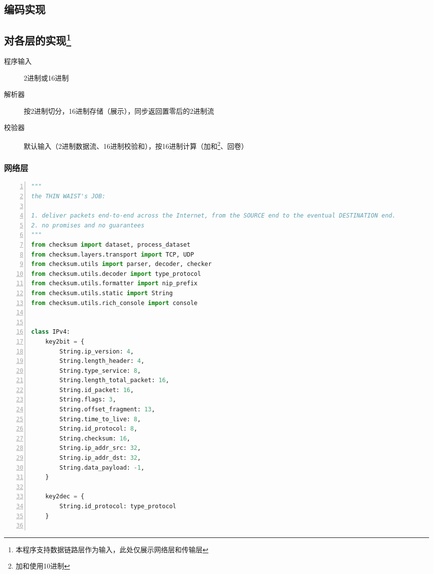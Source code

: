 \documentclass[a4paper,11pt]{article}
\begin{document}
\begin{spacing}{1.2}
\begin{CJK}{UTF8}{gbsn}
\section{编码实现}

\subsection{对各层的实现\footnote{本程序支持数据链路层作为输入，此处仅展示网络层和传输层}}

\begin{description}
	\item [程序输入] 2进制或16进制
	\item [解析器] 按2进制切分，16进制存储（展示），同步返回置零后的2进制流
	\item [校验器] 默认输入（2进制数据流、16进制校验和），按16进制计算（加和\footnote{加和使用10进制}、回卷）
\end{description}

\subsubsection{网络层}

\begin{lstlisting}[language = Python, numbers=left, numberstyle=\tiny,keywordstyle=\color{blue!70},commentstyle=\color{red!50!green!50!blue!50},frame=shadowbox,rulesepcolor=\color{red!20!green!20!blue!20},basicstyle=\ttfamily]
"""
the THIN WAIST's JOB:

1. deliver packets end-to-end across the Internet, from the SOURCE end to the eventual DESTINATION end.
2. no promises and no guarantees
"""
from checksum import dataset, process_dataset
from checksum.layers.transport import TCP, UDP
from checksum.utils import parser, decoder, checker
from checksum.utils.decoder import type_protocol
from checksum.utils.formatter import nip_prefix
from checksum.utils.static import String
from checksum.utils.rich_console import console


class IPv4:
    key2bit = {
        String.ip_version: 4,
        String.length_header: 4,
        String.type_service: 8,
        String.length_total_packet: 16,
        String.id_packet: 16,
        String.flags: 3,
        String.offset_fragment: 13,
        String.time_to_live: 8,
        String.id_protocol: 8,
        String.checksum: 16,
        String.ip_addr_src: 32,
        String.ip_addr_dst: 32,
        String.data_payload: -1,
    }

    key2dec = {
        String.id_protocol: type_protocol
    }


\end{lstlisting}
\end{CJK}
\end{spacing}
\end{document}
